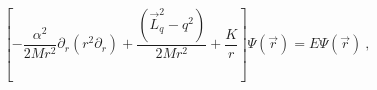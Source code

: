 \begin{equation}
\label{S}
\left[-\frac{\alpha^2}{2Mr^2}\partial_r(r^2\partial_r)+\frac{(\vec{L}_q^2
-q^2)}{2Mr^2}+\frac Kr\right]\Psi(\vec r)=E\Psi(\vec r) \ ,
\end{equation}


